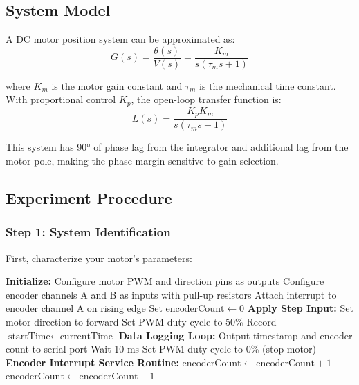 \subsection{System Model}

A DC motor position system can be approximated as:
\begin{equation}
G(s) = \frac{\theta(s)}{V(s)} = \frac{K_m}{s(\tau_m s + 1)}
\label{eq:motor_plant}
\end{equation}

where $K_m$ is the motor gain constant and $\tau_m$ is the mechanical time constant. With proportional control $K_p$, the open-loop transfer function is:
\begin{equation}
L(s) = \frac{K_p K_m}{s(\tau_m s + 1)}
\label{eq:motor_loop}
\end{equation}

This system has 90° of phase lag from the integrator and additional lag from the motor pole, making the phase margin sensitive to gain selection.

\subsection{Experiment Procedure}

\subsubsection{Step 1: System Identification}

First, characterize your motor's parameters:

\begin{algorithm}
\caption{Motor Identification via Step Response Test}
\begin{algorithmic}[1]
\State \textbf{Initialize:}
\State \hspace{1em} Configure motor PWM and direction pins as outputs
\State \hspace{1em} Configure encoder channels A and B as inputs with pull-up resistors
\State \hspace{1em} Attach interrupt to encoder channel A on rising edge
\State \hspace{1em} Set $\text{encoderCount} \gets 0$
\State
\State \textbf{Apply Step Input:}
\State \hspace{1em} Set motor direction to forward
\State \hspace{1em} Set PWM duty cycle to 50\%
\State \hspace{1em} Record $\text{startTime} \gets \text{currentTime}$
\State
\State \textbf{Data Logging Loop:}
    \State Output timestamp and encoder count to serial port
    \State Wait 10 ms
\EndWhile
\State Set PWM duty cycle to 0\% (stop motor)
\State
\State \textbf{Encoder Interrupt Service Routine:}
    \State $\text{encoderCount} \gets \text{encoderCount} + 1$
\Else
    \State $\text{encoderCount} \gets \text{encoderCount} - 1$
\EndIf
\end{algorithmic}
\end{algorithm}

